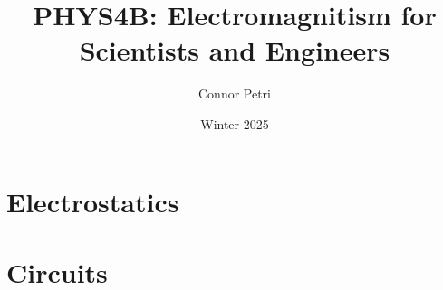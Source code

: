 \documentclass[12pt, letterpaper]{article}
\title{PHYS4B: Electromagnitism for \\Scientists and Engineers}
\author{Connor Petri}
\date{Winter 2025}
\begin{document}
\maketitle

\pagebreak

\tableofcontents

\pagebreak

\section{Electrostatics}




\section{Circuits}


\end{document}
